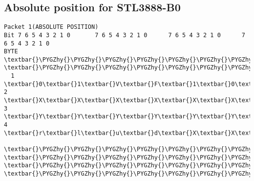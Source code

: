 \documentclass[a4paper,8pt,english]{sphinxmanual}
\def\PYGZhy{\char`\-}
\begin{document}
\subsection{Absolute position for STL3888-B0}
\label{input/devices/sentelic:absolute-position-for-stl3888-b0}
\begin{Verbatim}[commandchars=\\\{\}]
Packet 1(ABSOLUTE POSITION)
Bit 7 6 5 4 3 2 1 0       7 6 5 4 3 2 1 0      7 6 5 4 3 2 1 0      7 6 5 4 3 2 1 0
BYTE  \textbar{}\PYGZhy{}\PYGZhy{}\PYGZhy{}\PYGZhy{}\PYGZhy{}\PYGZhy{}\PYGZhy{}\PYGZhy{}\PYGZhy{}\PYGZhy{}\PYGZhy{}\PYGZhy{}\PYGZhy{}\PYGZhy{}\PYGZhy{}\textbar{}BYTE \textbar{}\PYGZhy{}\PYGZhy{}\PYGZhy{}\PYGZhy{}\PYGZhy{}\PYGZhy{}\PYGZhy{}\PYGZhy{}\PYGZhy{}\PYGZhy{}\PYGZhy{}\PYGZhy{}\PYGZhy{}\PYGZhy{}\PYGZhy{}\textbar{}BYTE\textbar{}\PYGZhy{}\PYGZhy{}\PYGZhy{}\PYGZhy{}\PYGZhy{}\PYGZhy{}\PYGZhy{}\PYGZhy{}\PYGZhy{}\PYGZhy{}\PYGZhy{}\PYGZhy{}\PYGZhy{}\PYGZhy{}\PYGZhy{}\textbar{}BYTE\textbar{}\PYGZhy{}\PYGZhy{}\PYGZhy{}\PYGZhy{}\PYGZhy{}\PYGZhy{}\PYGZhy{}\PYGZhy{}\PYGZhy{}\PYGZhy{}\PYGZhy{}\PYGZhy{}\PYGZhy{}\PYGZhy{}\PYGZhy{}\textbar{}
  1   \textbar{}0\textbar{}1\textbar{}V\textbar{}F\textbar{}1\textbar{}0\textbar{}R\textbar{}L\textbar{}  2  \textbar{}X\textbar{}X\textbar{}X\textbar{}X\textbar{}X\textbar{}X\textbar{}X\textbar{}X\textbar{}  3 \textbar{}Y\textbar{}Y\textbar{}Y\textbar{}Y\textbar{}Y\textbar{}Y\textbar{}Y\textbar{}Y\textbar{}  4 \textbar{}r\textbar{}l\textbar{}u\textbar{}d\textbar{}X\textbar{}X\textbar{}Y\textbar{}Y\textbar{}
      \textbar{}\PYGZhy{}\PYGZhy{}\PYGZhy{}\PYGZhy{}\PYGZhy{}\PYGZhy{}\PYGZhy{}\PYGZhy{}\PYGZhy{}\PYGZhy{}\PYGZhy{}\PYGZhy{}\PYGZhy{}\PYGZhy{}\PYGZhy{}\textbar{}     \textbar{}\PYGZhy{}\PYGZhy{}\PYGZhy{}\PYGZhy{}\PYGZhy{}\PYGZhy{}\PYGZhy{}\PYGZhy{}\PYGZhy{}\PYGZhy{}\PYGZhy{}\PYGZhy{}\PYGZhy{}\PYGZhy{}\PYGZhy{}\textbar{}    \textbar{}\PYGZhy{}\PYGZhy{}\PYGZhy{}\PYGZhy{}\PYGZhy{}\PYGZhy{}\PYGZhy{}\PYGZhy{}\PYGZhy{}\PYGZhy{}\PYGZhy{}\PYGZhy{}\PYGZhy{}\PYGZhy{}\PYGZhy{}\textbar{}    \textbar{}\PYGZhy{}\PYGZhy{}\PYGZhy{}\PYGZhy{}\PYGZhy{}\PYGZhy{}\PYGZhy{}\PYGZhy{}\PYGZhy{}\PYGZhy{}\PYGZhy{}\PYGZhy{}\PYGZhy{}\PYGZhy{}\PYGZhy{}\textbar{}


\end{Verbatim}
\end{document}
